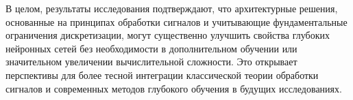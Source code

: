 В целом, результаты исследования подтверждают, что архитектурные решения, основанные на принципах обработки сигналов и учитывающие фундаментальные ограничения дискретизации, могут существенно улучшить свойства глубоких нейронных сетей без необходимости в дополнительном обучении или значительном увеличении вычислительной сложности. Это открывает перспективы для более тесной интеграции классической теории обработки сигналов и современных методов глубокого обучения в будущих исследованиях. 